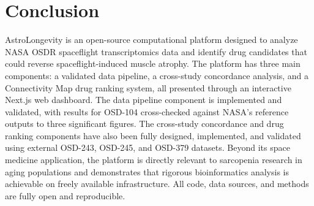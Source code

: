 \documentclass[conference]{IEEEtran}
\begin{document}
\section{Conclusion}

AstroLongevity is an open-source computational platform designed to analyze NASA OSDR spaceflight transcriptomics data and identify drug candidates that could reverse spaceflight-induced muscle atrophy. The platform has three main components: a validated data pipeline, a cross-study concordance analysis, and a Connectivity Map drug ranking system, all presented through an interactive Next.js web dashboard. The data pipeline component is implemented and validated, with results for OSD-104 cross-checked against NASA's reference outputs to three significant figures. The cross-study concordance and drug ranking components have also been fully designed, implemented, and validated using external OSD-243, OSD-245, and OSD-379 datasets. Beyond its space medicine application, the platform is directly relevant to sarcopenia research in aging populations and demonstrates that rigorous bioinformatics analysis is achievable on freely available infrastructure. All code, data sources, and methods are fully open and reproducible.
\end{document}
